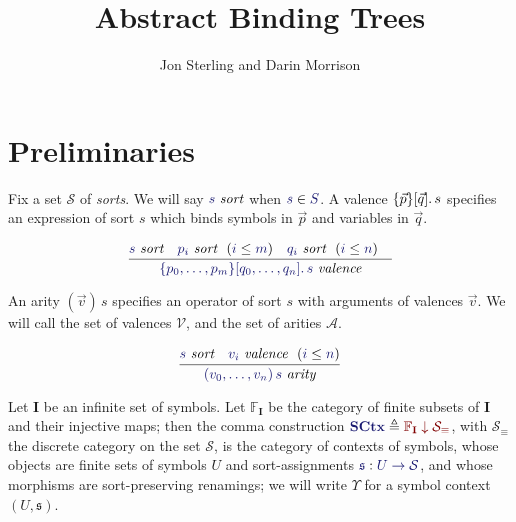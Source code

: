 \documentclass[11pt]{article}
\theoremstyle{definition}
\theoremstyle{remark}
\numberwithin{equation}{section}
\def\IModeColorName{MidnightBlue}
\def\OModeColorName{Maroon}
\newcommand\IMode[1]{{\color{\IModeColorName}{#1}}}
\newcommand\OMode[1]{{\color{\OModeColorName}{#1}}}
\newcommand\HypJ[2]{#1\ \ (#2)}
\newcommand\Member[2]{\IMode{#1}\in\IMode{#2}}
\newcommand\Of[2]{\IMode{#1}: \IMode{#2}}
\newcommand\MkValence[3]{%
  \ifthenelse{\equal{#1}{}}{}{%
    \{#1\}%
  }%
  \ifthenelse{\equal{#2}{}}{}{%
    [#2]%
  }.\, #3%
}
\newcommand\MkArity[2]{(#1)\, #2}
\newcommand\IsArity[1]{\IMode{#1}\ \textit{arity}}
\newcommand\IsValence[1]{\IMode{#1}\ \textit{valence}}
\newcommand\IsSort[1]{\IMode{#1}\ \textit{sort}}
\newcommand\Leq[2]{\IMode{#1}\leq\IMode{#2}}
\newcommand\Symbols{\mathbf{I}}
\newcommand\SymSets{\mathbb{F}_\Symbols}
\newcommand\Sorts{\mathcal{S}}
\newcommand\Valences{\mathcal{V}}
\newcommand\Arities{\mathcal{A}}
\newcommand\Discrete[1]{#1_{\equiv}}
\newcommand\SCtx{\mathbf{SCtx}}
\newcommand\Comma[2]{#1 \downarrow#2}
\newcommand\Define[2]{\IMode{#1}\triangleq\OMode{#2}}
\begin{document}
\title{Abstract Binding Trees}
\date{}
\author{Jon Sterling and Darin Morrison}
\maketitle

\section{Preliminaries}

Fix a set $\Sorts$ of \emph{sorts}. We will say $\IsSort{s}$ when
$\Member{s}{S}$. A valence $\MkValence{\vec{p}}{\vec{q}}{s}$ specifies an
expression of sort $s$ which binds symbols in $\vec{p}$ and variables in
$\vec{q}$.

\[
  \infer{
    \IsValence{\MkValence{p_0,\dots,p_m}{q_0,\dots,q_n}{s}}
  }{
    \IsSort{s} &
    \HypJ{\IsSort{p_i}}{\Leq{i}{m}} &
    \HypJ{\IsSort{q_i}}{\Leq{i}{n}} &
  }
\]

An arity $\MkArity{\vec{v}}{s}$ specifies an operator of sort $s$ with
arguments of valences $\vec{v}$. We will call the set of valences $\Valences$,
and the set of arities $\Arities$.

\[
  \infer{
    \IsArity{\MkArity{v_0,\ldots,v_n}{s}}
  }{
    \IsSort{s} &
    \HypJ{\IsValence{v_i}}{\Leq{i}{n}}
  }
\]


Let $\Symbols$ be an infinite set of symbols. Let $\SymSets$ be the category of
finite subsets of $\Symbols$ and their injective maps; then the comma
construction $\Define{\SCtx}{\Comma{\SymSets}{\Discrete{\Sorts}}}$, with
$\Discrete{\Sorts}$ the discrete category on the set $\mathcal{S}$, is the
category of contexts of symbols, whose objects are finite sets of symbols $U$
and sort-assignments $\Of{\mathfrak{s}}{U\to\Sorts}$, and whose morphisms are
sort-preserving renamings; we will write $\Upsilon$ for a symbol context
$(U,\mathfrak{s})$.
\end{document}
